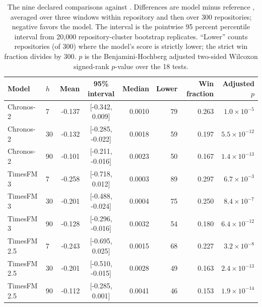 \begin{table}[htbp]
\centering\small
\caption{The nine declared comparisons against \lm{}. Differences are model minus reference \qs{}, averaged
over three windows within repository and then over 300 repositories; negative favors the model. The interval
is the pointwise 95 percent percentile interval from 20,000 repository-cluster bootstrap replicates. ``Lower''
counts repositories (of 300) where the model's score is strictly lower; the strict win fraction divides by
300. $p$ is the Benjamini-Hochberg adjusted two-sided Wilcoxon signed-rank $p$-value over the 18 tests.}
\label{tab:lm}
\begin{tabular}{llrcrrrr}
\toprule
Model & $h$ & Mean & 95\% interval & Median & Lower & Win fraction & Adjusted $p$ \\
\midrule
Chronos-2 & 7 & -0.137 & [-0.342, 0.009] & 0.0010 & 79 & 0.263 & $1.0 \times 10^{-5}$ \\
Chronos-2 & 30 & -0.132 & [-0.285, -0.022] & 0.0018 & 59 & 0.197 & $5.5 \times 10^{-12}$ \\
Chronos-2 & 90 & -0.101 & [-0.211, -0.016] & 0.0023 & 50 & 0.167 & $1.4 \times 10^{-13}$ \\
TimesFM 3 & 7 & -0.258 & [-0.718, 0.012] & 0.0003 & 89 & 0.297 & $6.7 \times 10^{-3}$ \\
TimesFM 3 & 30 & -0.201 & [-0.488, -0.024] & 0.0004 & 75 & 0.250 & $8.4 \times 10^{-7}$ \\
TimesFM 3 & 90 & -0.128 & [-0.296, -0.016] & 0.0032 & 54 & 0.180 & $6.4 \times 10^{-12}$ \\
TimesFM 2.5 & 7 & -0.243 & [-0.695, 0.025] & 0.0015 & 68 & 0.227 & $3.2 \times 10^{-8}$ \\
TimesFM 2.5 & 30 & -0.201 & [-0.510, -0.015] & 0.0028 & 49 & 0.163 & $2.4 \times 10^{-13}$ \\
TimesFM 2.5 & 90 & -0.112 & [-0.285, 0.001] & 0.0041 & 46 & 0.153 & $1.9 \times 10^{-14}$ \\
\bottomrule
\end{tabular}
\end{table}

